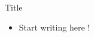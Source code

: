 	\section{}
	
	\begin{frame}{Title}

		\begin{itemize}
			\item Start writing here !
		\end{itemize}

	\end{frame}